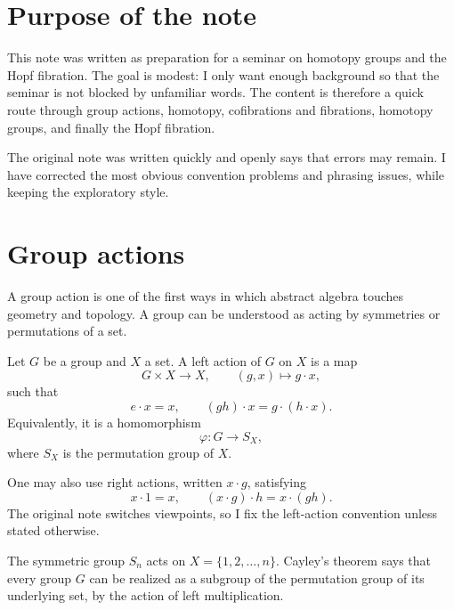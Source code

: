 
\section{Purpose of the note}

This note was written as preparation for a seminar on homotopy groups and the Hopf fibration.  The goal is modest: I only want enough background so that the seminar is not blocked by unfamiliar words.  The content is therefore a quick route through group actions, homotopy, cofibrations and fibrations, homotopy groups, and finally the Hopf fibration.

\begin{caution}
The original note was written quickly and openly says that errors may remain.  I have corrected the most obvious convention problems and phrasing issues, while keeping the exploratory style.
\end{caution}

\section{Group actions}

A group action is one of the first ways in which abstract algebra touches geometry and topology.  A group can be understood as acting by symmetries or permutations of a set.

\begin{definition}
Let \(G\) be a group and \(X\) a set.  A left action of \(G\) on \(X\) is a map
\[
  G\times X\to X,\qquad (g,x)\mapsto g\cdot x,
\]
such that
\[
  e\cdot x=x,\qquad (gh)\cdot x=g\cdot(h\cdot x).
\]
Equivalently, it is a homomorphism
\[
  \varphi:G\to S_X,
\]
where \(S_X\) is the permutation group of \(X\).
\end{definition}

\begin{remark}
One may also use right actions, written \(x\cdot g\), satisfying
\[
  x\cdot 1=x,\qquad (x\cdot g)\cdot h=x\cdot(gh).
\]
The original note switches viewpoints, so I fix the left-action convention unless stated otherwise.
\end{remark}

\begin{example}
The symmetric group \(S_n\) acts on \(X=\{1,2,\dots,n\}\).  Cayley's theorem says that every group \(G\) can be realized as a subgroup of the permutation group of its underlying set, by the action of left multiplication.
\end{example}


